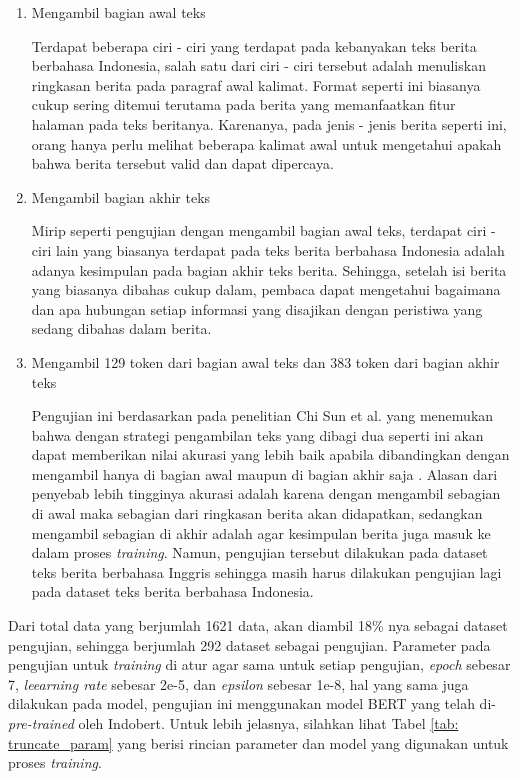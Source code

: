 \begin{enumerate}
    \item Mengambil bagian awal teks

          Terdapat beberapa ciri - ciri yang terdapat pada kebanyakan teks berita berbahasa Indonesia, salah satu dari ciri - ciri tersebut adalah menuliskan ringkasan berita pada paragraf awal kalimat. Format seperti ini biasanya cukup sering ditemui terutama pada berita yang memanfaatkan fitur halaman pada teks beritanya. Karenanya, pada jenis - jenis berita seperti ini, orang hanya perlu melihat beberapa kalimat awal untuk mengetahui apakah bahwa berita tersebut valid dan dapat dipercaya.

    \item Mengambil bagian akhir teks

          Mirip seperti pengujian dengan mengambil bagian awal teks, terdapat ciri - ciri lain yang biasanya terdapat pada teks berita berbahasa Indonesia adalah adanya kesimpulan pada bagian akhir teks berita. Sehingga, setelah isi berita yang biasanya dibahas cukup dalam, pembaca dapat mengetahui bagaimana dan apa hubungan setiap informasi yang disajikan dengan peristiwa yang sedang dibahas dalam berita.

    \item Mengambil 129 token dari bagian awal teks dan 383 token dari bagian akhir teks

          Pengujian ini berdasarkan pada penelitian Chi Sun et al. yang menemukan bahwa dengan strategi pengambilan teks yang dibagi dua seperti ini akan dapat memberikan nilai akurasi yang lebih baik apabila dibandingkan dengan mengambil hanya di bagian awal maupun di bagian akhir saja \cite{sun2019fine}. Alasan dari penyebab lebih tingginya akurasi adalah karena dengan mengambil sebagian di awal maka sebagian dari ringkasan berita akan didapatkan, sedangkan mengambil sebagian di akhir adalah agar kesimpulan berita juga masuk ke dalam proses \textit{training}. Namun, pengujian tersebut dilakukan pada dataset teks berita berbahasa Inggris sehingga masih harus dilakukan pengujian lagi pada dataset teks berita berbahasa Indonesia.

\end{enumerate}

Dari total data yang berjumlah 1621 data, akan diambil 18\% nya sebagai dataset pengujian, sehingga berjumlah 292 dataset sebagai pengujian. Parameter pada pengujian untuk \textit{training} di atur agar sama untuk setiap pengujian, \textit{epoch} sebesar 7, \textit{leearning rate} sebesar 2e-5, dan \textit{epsilon} sebesar 1e-8, hal yang sama juga dilakukan pada model, pengujian ini menggunakan model BERT yang telah di-\textit{pre-trained} oleh Indobert. Untuk lebih jelasnya, silahkan lihat Tabel \ref{tab: truncate_param} yang berisi rincian parameter dan model yang digunakan untuk proses \textit{training}.


